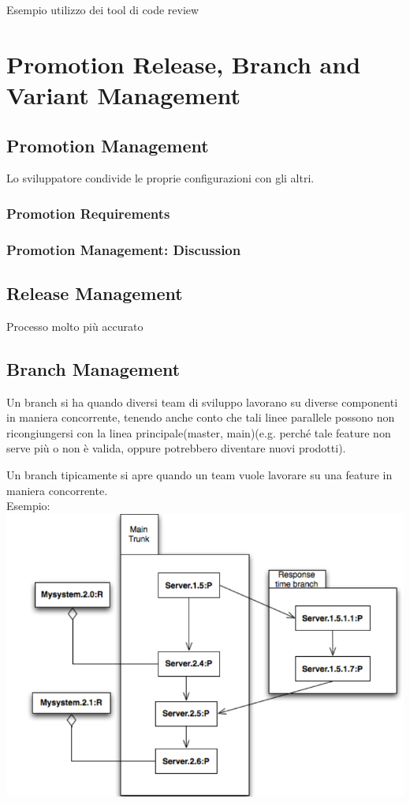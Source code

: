 \documentclass[10pt,a4paper]{book}
\begin{document}
Esempio utilizzo dei tool di code review

\section{Promotion Release, Branch and Variant Management}
\subsection{Promotion Management}
Lo sviluppatore condivide le proprie configurazioni con gli altri.

\subsubsection{Promotion Requirements}

\subsubsection{Promotion Management: Discussion}



\subsection{Release Management}
Processo molto più accurato



\subsection{Branch Management}
Un branch si ha quando diversi team di sviluppo lavorano su diverse componenti in maniera concorrente, tenendo anche conto che tali linee parallele possono non ricongiungersi con la linea principale(master, main)(e.g. perché tale feature non serve più o non è valida, oppure potrebbero diventare nuovi prodotti).

Un branch tipicamente si apre quando un team vuole lavorare su una feature in maniera concorrente. \\
Esempio:\\

\includegraphics[scale=0.35]{branch.png} \\ \\
\end{document}
